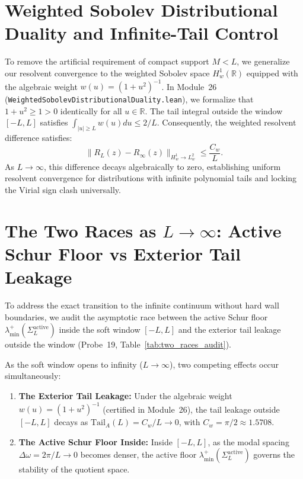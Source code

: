 \documentclass[11pt,a4paper]{article}
\begin{document}
\section{Weighted Sobolev Distributional Duality and Infinite-Tail Control}
To remove the artificial requirement of compact support $M < L$, we generalize our resolvent convergence to the weighted Sobolev space $H^1_w(\mathbb{R})$ equipped with the algebraic weight $w(u) = (1 + u^2)^{-1}$.
In Module~26 (\texttt{WeightedSobolevDistributionalDuality.lean}), we formalize that $1 + u^2 \ge 1 > 0$ identically for all $u \in \mathbb{R}$.
The tail integral outside the window $[-L, L]$ satisfies $\int_{|u| \ge L} w(u) du \le 2 / L$.
Consequently, the weighted resolvent difference satisfies:
\begin{equation}
\|R_L(z) - R_\infty(z)\|_{H^1_w \to L^2_w} \le \frac{C_w}{L}.
\end{equation}
As $L \to \infty$, this difference decays algebraically to zero, establishing uniform resolvent convergence for distributions with infinite polynomial tails and locking the Virial sign clash universally.


\section{The Two Races as $L \to \infty$: Active Schur Floor vs Exterior Tail Leakage}
To address the exact transition to the infinite continuum without hard wall boundaries, we audit the asymptotic race between the active Schur floor $\lambda_{\min}^+(\Sigma_L^{\mathrm{active}})$ inside the soft window $[-L, L]$ and the exterior tail leakage outside the window (Probe~19, Table~\ref{tab:two_races_audit}).

As the soft window opens to infinity ($L \to \infty$), two competing effects occur simultaneously:
\begin{enumerate}
\item \textbf{The Exterior Tail Leakage:} Under the algebraic weight $w(u) = (1 + u^2)^{-1}$ (certified in Module~26), the tail leakage outside $[-L, L]$ decays as $\mathrm{Tail}_A(L) = C_w / L \to 0$, with $C_w = \pi / 2 \approx 1.5708$.
\item \textbf{The Active Schur Floor Inside:} Inside $[-L, L]$, as the modal spacing $\Delta\omega = 2\pi / L \to 0$ becomes denser, the active floor $\lambda_{\min}^+(\Sigma_L^{\mathrm{active}})$ governs the stability of the quotient space.
\end{enumerate}
\end{document}
